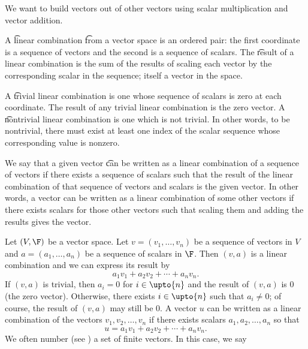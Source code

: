 

We want to build vectors out of other vectors using scalar multiplication and vector addition.


A \t{linear combination} \t{from} a vector space is an ordered pair: the first coordinate is a sequence of vectors and the second is a sequence of scalars.
The \t{result} of a linear combination is the sum of the results of scaling each vector by the corresponding scalar in the sequence; itself a vector in the space.

A \t{trivial linear combination} is one whose sequence of scalars is zero at each coordinate.
The result of any trivial linear combination is the zero vector.
A \t{nontrivial linear combination} is one which is not trivial.
In other words, to be nontrivial, there must exist at least one index of the scalar sequence whose corresponding value is nonzero.

We say that a given vector \t{can be written as a linear combination of} a sequence of vectors if there exists a sequence of scalars such that the result of the linear combination of that sequence of vectors and scalars is the given vector.
In other words, a vector can be written as a linear combination of some other vectors if there exists scalars for those other vectors such that scaling them and adding the results gives the vector.


Let $(V, \F)$ be a vector space.
Let $v = (v_1, \dots , v_n)$ be a sequence of vectors in $V$ and
$a = (a_1, \dots , a_n)$ be a sequence of scalars in $\F$.
Then $(v, a)$ is a linear combination and we can express its result by
  \[
a_1v_1 + a_2v_2 + \cdots + a_n v_n.
  \]
If $(v,a)$ is trivial, then $a_i = 0$ for $i \in \upto{n}$ and the result of $(v, a)$ is $0$ (the zero vector).
Otherwise, there exists $i \in \upto{n}$ such that $a_i \neq 0$; of course, the result of $(v, a)$ may still be $0$.
A vector $u$ can be written as a linear combination of the vectors $v_1, v_2, \dots , v_n$ if there exists scalars $a_1, a_2, \dots , a_n$ so that
    \[
u = a_1v_1 + a_2v_2 + \cdots + a_nv_n.
    \]
We often number (see ) a set of finite vectors.
In this case, we say 

